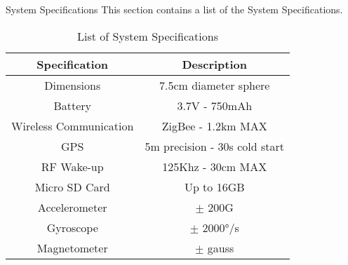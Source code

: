\begin{customAppendixPage}{System Specifications}
This section contains a list of the System Specifications.
\end{customAppendixPage}
\renewcommand*{\thepage}{\thesection-\arabic{page}}

\begin{table}
\caption{List of System Specifications \label{tab:systemSpecs}}
\centering
    \begin{tabular}{|c|c|}
    \hline
    \rowcolor{Gray} Specification          & Description                   \\ \hline \hline 
    Dimensions             & 7.5cm diameter sphere          \\
    Battery                & 3.7V - 750mAh                 \\
    Wireless Communication & ZigBee - 1.2km MAX            \\
    GPS                    & 5m precision - 30s cold start \\
    RF Wake-up             & 125Khz - 30cm MAX             \\
    Micro SD Card          & Up to 16GB                    \\
    Accelerometer          & $\pm$ 200G                      \\
    Gyroscope              & $\pm$ 2000°/s                   \\
    Magnetometer           & $\pm$ gauss                    \\
	\hline
    \end{tabular}
\end{table}